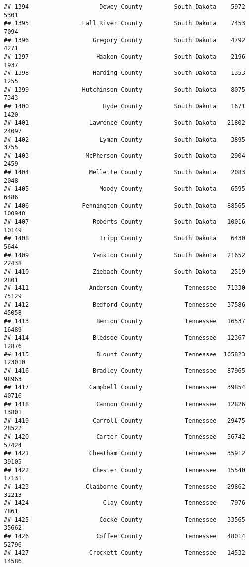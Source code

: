\documentclass[
]{article}
\begin{document}
\begin{verbatim}
## 1394                    Dewey County         South Dakota    5972    5301
## 1395               Fall River County         South Dakota    7453    7094
## 1396                  Gregory County         South Dakota    4792    4271
## 1397                   Haakon County         South Dakota    2196    1937
## 1398                  Harding County         South Dakota    1353    1255
## 1399               Hutchinson County         South Dakota    8075    7343
## 1400                     Hyde County         South Dakota    1671    1420
## 1401                 Lawrence County         South Dakota   21802   24097
## 1402                    Lyman County         South Dakota    3895    3755
## 1403                McPherson County         South Dakota    2904    2459
## 1404                 Mellette County         South Dakota    2083    2048
## 1405                    Moody County         South Dakota    6595    6486
## 1406               Pennington County         South Dakota   88565  100948
## 1407                  Roberts County         South Dakota   10016   10149
## 1408                    Tripp County         South Dakota    6430    5644
## 1409                  Yankton County         South Dakota   21652   22438
## 1410                  Ziebach County         South Dakota    2519    2801
## 1411                 Anderson County            Tennessee   71330   75129
## 1412                  Bedford County            Tennessee   37586   45058
## 1413                   Benton County            Tennessee   16537   16489
## 1414                  Bledsoe County            Tennessee   12367   12876
## 1415                   Blount County            Tennessee  105823  123010
## 1416                  Bradley County            Tennessee   87965   98963
## 1417                 Campbell County            Tennessee   39854   40716
## 1418                   Cannon County            Tennessee   12826   13801
## 1419                  Carroll County            Tennessee   29475   28522
## 1420                   Carter County            Tennessee   56742   57424
## 1421                 Cheatham County            Tennessee   35912   39105
## 1422                  Chester County            Tennessee   15540   17131
## 1423                Claiborne County            Tennessee   29862   32213
## 1424                     Clay County            Tennessee    7976    7861
## 1425                    Cocke County            Tennessee   33565   35662
## 1426                   Coffee County            Tennessee   48014   52796
## 1427                 Crockett County            Tennessee   14532   14586

\end{verbatim}
\end{document}
